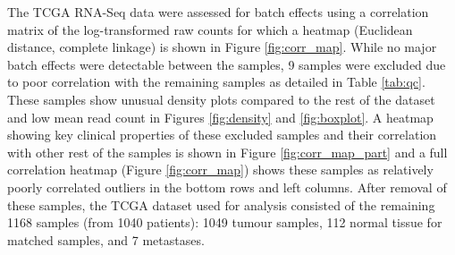 The TCGA RNA-Seq data were assessed for batch effects using a correlation matrix of the log-transformed raw counts for which a heatmap (Euclidean distance, complete linkage) is shown in Figure \ref{fig:corr_map}. While no major batch effects were detectable between the samples, 9 samples were excluded due to poor correlation with the remaining samples as detailed in Table \ref{tab:qc}. These samples show unusual density plots compared to the rest of the dataset and low mean read count in Figures \ref{fig:density} and \ref{fig:boxplot}. A heatmap showing key clinical properties of these excluded samples and their correlation with other rest of the samples is shown in Figure \ref{fig:corr_map_part} and a full correlation heatmap (Figure \ref{fig:corr_map}) shows these samples as relatively poorly correlated outliers in the bottom rows and left columns.
After removal of these samples, the TCGA dataset used for analysis consisted of the remaining 1168 samples (from 1040 patients): 1049 tumour samples, 112 normal tissue for matched samples, and 7 metastases.

